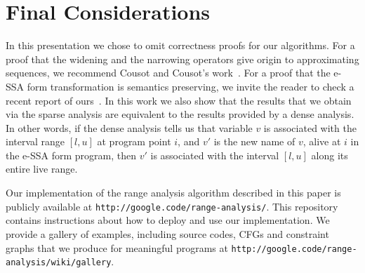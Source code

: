 \documentclass{llncs}
\begin{document}












\section{Final Considerations}
\label{sec:con}

In this presentation we chose to omit correctness proofs for our algorithms.
For a proof that the widening and the narrowing operators give origin to
approximating sequences, we recommend Cousot and Cousot's work~\cite{Cousot}.
For a proof that the e-SSA form transformation is semantics preserving, we
invite the reader to check a recent report of ours~\cite{XXXX}.
In this work we also show that the results that we obtain via the
sparse analysis are equivalent to the results provided by a dense analysis.
In other words, if the dense analysis tells us that variable $v$ is
associated with the interval range $[l, u]$ at program point $i$, and $v'$
is the new name of $v$, alive at $i$ in the e-SSA form program, then $v'$ is
associated with the interval $[l, u]$ along its entire live range.

Our implementation of the range analysis algorithm described in this paper is
publicly available at \texttt{http://google.code/range-analysis/}.
This repository contains instructions about how to deploy and use our
implementation.
We provide a gallery of examples, including source codes,
CFGs and constraint graphs that we produce for meaningful programs at
\texttt{http://google.code/range-analysis/wiki/gallery}.



\end{document}
